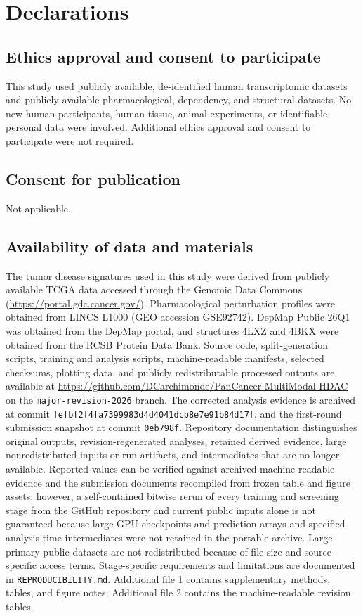 \section*{Declarations}

\subsection*{Ethics approval and consent to participate}
This study used publicly available, de-identified human transcriptomic datasets and publicly available pharmacological, dependency, and structural datasets. No new human participants, human tissue, animal experiments, or identifiable personal data were involved. Additional ethics approval and consent to participate were not required.

\subsection*{Consent for publication}
Not applicable.

\subsection*{Availability of data and materials}
\begin{roundtworevision}
The tumor disease signatures used in this study were derived from publicly available TCGA data accessed through the Genomic Data Commons (\url{https://portal.gdc.cancer.gov/}). Pharmacological perturbation profiles were obtained from LINCS L1000 (GEO accession GSE92742). DepMap Public 26Q1 was obtained from the DepMap portal, and structures 4LXZ and 4BKX were obtained from the RCSB Protein Data Bank. Source code, split-generation scripts, training and analysis scripts, machine-readable manifests, selected checksums, plotting data, and publicly redistributable processed outputs are available at \url{https://github.com/DCarchimonde/PanCancer-MultiModal-HDAC} on the \texttt{major-revision-2026} branch. The corrected analysis evidence is archived at commit \texttt{fefbf2f4fa7399983d4d4041dcb8e7e91b84d17f}, and the first-round submission snapshot at commit \texttt{0eb798f}. Repository documentation distinguishes original outputs, revision-regenerated analyses, retained derived evidence, large nonredistributed inputs or run artifacts, and intermediates that are no longer available. Reported values can be verified against archived machine-readable evidence and the submission documents recompiled from frozen table and figure assets; however, a self-contained bitwise rerun of every training and screening stage from the GitHub repository and current public inputs alone is not guaranteed because large GPU checkpoints and prediction arrays and specified analysis-time intermediates were not retained in the portable archive. Large primary public datasets are not redistributed because of file size and source-specific access terms. Stage-specific requirements and limitations are documented in \texttt{REPRODUCIBILITY.md}. Additional file 1 contains supplementary methods, tables, and figure notes; Additional file 2 contains the machine-readable revision tables.
\end{roundtworevision}

